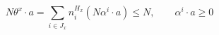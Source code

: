 \begin{equation}
N \theta^x \cdot a = \sum_{i\in J_x} n_i^{H_x}
\left(N \alpha^i \cdot a\right) \le N,
\quad\quad \alpha^i \cdot a \ge 0
\end{equation}

